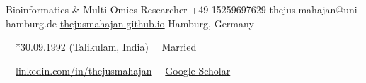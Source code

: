 \documentclass{thejus_cv}
\begin{document}
         {Bioinformatics \& Multi-Omics Researcher}
         {+49-15259697629}
         {thejus.mahajan@uni-hamburg.de}
         {\href{https://thejusmahajan.github.io}{thejusmahajan.github.io}}
         {Hamburg, Germany}

\vspace{-0.5cm}
{\small\color{white}
\faCalendar\ \ *30.09.1992 (Talikulam, India) \hspace{0.5cm} \faUser\ \ Married
}\par
\vspace{0.1cm}
{\small\color{white}
\faLinkedin\ \ \href{https://www.linkedin.com/in/thejusmahajan/}{linkedin.com/in/thejusmahajan}
\hspace{0.5cm}
\faGraduationCap\ \ \href{https://scholar.google.com/citations?user=PJkZwAwAAAAJ}{Google Scholar}
}\par
\vspace{0.1cm}
\end{document}
